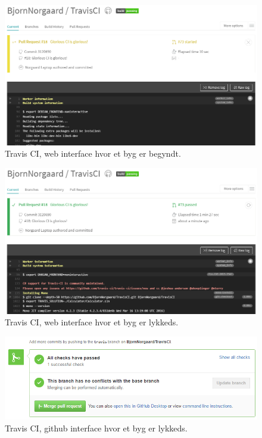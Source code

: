 \begin{figure}
\centering
\includegraphics[width=\linewidth]{figs/travis/travisbuildstarted}
\caption{Travis CI, web interface hvor et byg er begyndt.}
\label{fig:travisbuildstarted}
\end{figure}

\begin{figure}
\centering
\includegraphics[width=\linewidth]{figs/travis/travisbuildsuccess}
\caption{Travis CI, web interface hvor et byg er lykkeds.}
\label{fig:travisbuildsuccess}
\end{figure}

\begin{figure}
\centering
\includegraphics[width=\linewidth]{figs/travis/travisgithubsuccess}
\caption{Travis CI, github interface hvor et byg er lykkeds.}
\label{fig:travisgithubsuccess}
\end{figure}

